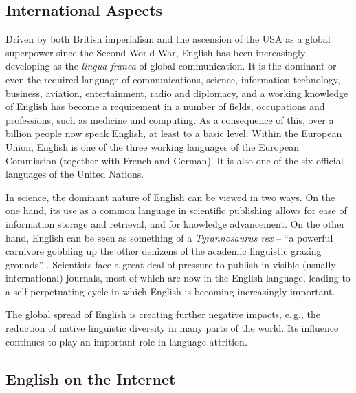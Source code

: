 \begin{multicols}{2}

\subsection{International Aspects}

Driven by both British imperialism and the ascension of the USA as a global superpower since the Second World War, English has been increasingly developing as the \emph{lingua franca} of global communication. It is the dominant or even the required language of communications, science, information technology, business, aviation, entertainment, radio and diplomacy, and a working knowledge of English has become a requirement in a number of fields, occupations and professions, such as medicine and computing. As a consequence of this, over a billion people now speak English, at least to a basic level. Within the European Union, English is one of the three working languages of the European Commission (together with French and German). It is also one of the six official languages of the United Nations.

     
In science, the dominant nature of English can be viewed in two ways. On the one hand, its use as a common language in scientific publishing allows for ease of information storage and retrieval, and for knowledge advancement. On the other hand, English can be seen as something of a \textit{Tyrannosaurus rex} -- ``a powerful carnivore gobbling up the other denizens of the academic linguistic grazing grounds'' \cite{swales}. Scientists face a great deal of pressure to publish in visible (usually international) journals, most of which are now in the English language, leading to a self-perpetuating cycle in which English is becoming increasingly important. 
    
The global spread of English is creating further negative impacts, e.\,g., the reduction of native linguistic diversity in many parts of the world. Its influence continues to play an important role in language attrition.

  
\subsection{English on the Internet}


\end{multicols}
